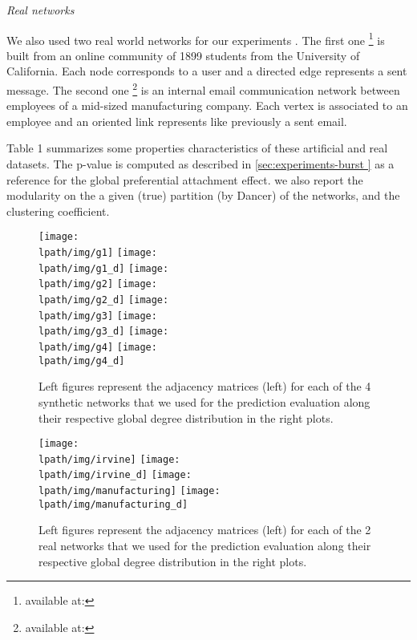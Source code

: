\textit{Real networks}

We also used two real world networks for our experiments .
The first one \footnote{available at:} is built from an online community of 1899 students from the University of California. Each node corresponds to a user and a    directed edge represents a sent message.
The second one \footnote{available at:} is an internal email communication network between employees of a mid-sized manufacturing company. Each vertex is associated  to an employee and an oriented link represents like previously a sent email.

Table 1 summarizes some properties characteristics of these artificial and real datasets. The  p-value is computed as described in \ref{sec:experiments-burst } as a reference for the global preferential attachment effect. we also report the modularity on the a given (true) partition (by Dancer) of the networks, and the clustering coefficient.

\begin{figure}[h]
	\centering
	
	\texttt{[image: \\lpath/img/g1]}
	\endminipage
	\texttt{[image: \\lpath/img/g1\_d]}
	\endminipage
	\vspace{-0.4cm}
	\texttt{[image: \\lpath/img/g2]}
	\endminipage
	\texttt{[image: \\lpath/img/g2\_d]}
	\endminipage
	\vspace{-0.4cm}
	\texttt{[image: \\lpath/img/g3]}
	\endminipage
	\texttt{[image: \\lpath/img/g3\_d]}
	\endminipage
	\vspace{-0.4cm}
	\texttt{[image: \\lpath/img/g4]}
	\endminipage
	\texttt{[image: \\lpath/img/g4\_d]}
	\endminipage
	
	\caption{Left figures represent the adjacency matrices (left) for each of the 4 synthetic networks that we used for the prediction evaluation along their respective global degree distribution in the right plots.}
	\label{fig:synt_graph}
\end{figure}

\begin{figure}[h]
	\centering
	
	
	\texttt{[image: \\lpath/img/irvine]}
	\endminipage
	\texttt{[image: \\lpath/img/irvine\_d]}
	\endminipage
	\vspace{-0.4cm}
	\texttt{[image: \\lpath/img/manufacturing]}
	\endminipage
	\texttt{[image: \\lpath/img/manufacturing\_d]}
	\endminipage
	\caption{Left figures represent the adjacency matrices (left) for each of the 2 real networks that we used for the prediction evaluation along their respective global degree distribution in the right plots.}
	\label{fig:real_graph}
\end{figure}



